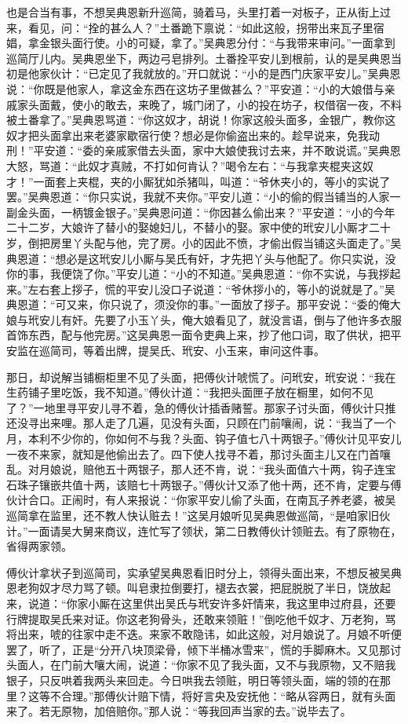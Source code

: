 也是合当有事，不想吴典恩新升巡简，骑着马，头里打着一对板子，正从街上过来，看见，问：“拴的甚么人？”土番跪下禀说：“如此这般，拐带出来瓦子里宿娼，拿金银头面行使。小的可疑，拿了。”吴典恩分付：“与我带来审问。”一面拿到巡简厅儿内。吴典恩坐下，两边弓皂排列。土番拴平安儿到根前，认的是吴典恩当初是他家伙计：“已定见了我就放的。”开口就说：“小的是西门庆家平安儿。”吴典恩说：“你既是他家人，拿这金东西在这坊子里做甚么？”平安道：“小的大娘借与亲戚家头面戴，使小的敢去，来晚了，城门闭了，小的投在坊子，权借宿一夜，不料被土番拿了。”吴典恩骂道：“你这奴才，胡说！你家这般头面多，金银广，教你这奴才把头面拿出来老婆家歇宿行使？想必是你偷盗出来的。趁早说来，免我动刑！”平安道：“委的亲戚家借去头面，家中大娘使我讨去来，并不敢说谎。”吴典恩大怒，骂道：“此奴才真贼，不打如何肯认？”喝令左右：“与我拿夹棍夹这奴才！”一面套上夹棍，夹的小厮犹如杀猪叫，叫道：“爷休夹小的，等小的实说了罢。”吴典恩道：“你只实说，我就不夹你。”平安儿道：“小的偷的假当铺当的人家一副金头面，一柄镀金银子。”吴典恩问道：“你因甚么偷出来？”平安道：“小的今年二十二岁，大娘许了替小的娶媳妇儿，不替小的娶。家中使的玳安儿小厮才二十岁，倒把房里丫头配与他，完了房。小的因此不愤，才偷出假当铺这头面走了。”吴典恩道：“想必是这玳安儿小厮与吴氏有奸，才先把丫头与他配了。你只实说，没你的事，我便饶了你。”平安儿道：“小的不知道。”吴典恩道：“你不实说，与我拶起来。”左右套上拶子，慌的平安儿没口子说道：“爷休拶小的，等小的说就是了。”吴典恩道：“可又来，你只说了，须没你的事。”一面放了拶子。那平安说：“委的俺大娘与玳安儿有奸。先要了小玉丫头，俺大娘看见了，就没言语，倒与了他许多衣服首饰东西，配与他完房。”这吴典恩一面令吏典上来，抄了他口词，取了供状，把平安监在巡简司，等着出牌，提吴氏、玳安、小玉来，审问这件事。

那日，却说解当铺橱柜里不见了头面，把傅伙计唬慌了。问玳安，玳安说：“我在生药铺子里吃饭，我不知道。”傅伙计道：“我把头面匣子放在橱里，如何不见了？”一地里寻平安儿寻不着，急的傅伙计插香赌誓。那家子讨头面，傅伙计只推还没寻出来哩。那人走了几遍，见没有头面，只顾在门前嚷闹，说：“我当了一个月，本利不少你的，你如何不与我？头面、钩子值七八十两银子。”傅伙计见平安儿一夜不来家，就知是他偷出去了。四下使人找寻不着，那讨头面主儿又在门首嚷乱。对月娘说，赔他五十两银子，那人还不肯，说：“我头面值六十两，钩子连宝石珠子镶嵌共值十两，该赔七十两银子。”傅伙计又添了他十两，还不肯，定要与傅伙计合口。正闹时，有人来报说：“你家平安儿偷了头面，在南瓦子养老婆，被吴巡简拿在监里，还不教人快认赃去！”这吴月娘听见吴典恩做巡简，“是咱家旧伙计。”一面请吴大舅来商议，连忙写了领状，第二日教傅伙计领赃去。有了原物在，省得两家领。

傅伙计拿状子到巡简司，实承望吴典恩看旧时分上，领得头面出来，不想反被吴典恩老狗奴才尽力骂了顿。叫皂隶拉倒要打，褪去衣裳，把屁脱脱了半日，饶放起来，说道：“你家小厮在这里供出吴氏与玳安许多奸情来，我这里申过府县，还要行牌提取吴氏来对证。你这老狗骨头，还敢来领赃！”倒吃他千奴才、万老狗，骂将出来，唬的往家中走不迭。来家不敢隐讳，如此这般，对月娘说了。月娘不听便罢了，听了，正是“分开八块顶梁骨，倾下半桶冰雪来”，慌的手脚麻木。又见那讨头面人，在门前大嚷大闹，说道：“你家不见了我头面，又不与我原物，又不赔我银子，只反哄着我两头来回走。今日哄我去领赃，明日等领头面，端的领的在那里？这等不合理。”那傅伙计赔下情，将好言央及安抚他：“略从容两日，就有头面来了。若无原物，加倍赔你。”那人说：“等我回声当家的去。”说毕去了。

